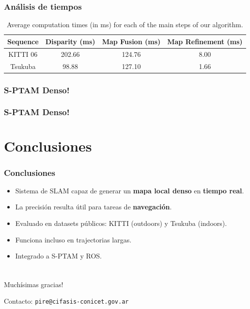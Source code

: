 \documentclass[compress]{beamer}
\begin{document}
\begin{frame}
	\frametitle{Análisis de tiempos}
	\begin{table}[!htb]
		\centering
		\small
		\begin{tabular}{cccc}
			\toprule
			Sequence & Disparity (ms) & Map Fusion (ms) & Map Refinement (ms) \\
			\midrule
			KITTI 06 & 202.66 & 124.76 & 8.00 \\
			Tsukuba & 98.88 & 127.10 & 1.66 \\
			\bottomrule
		\end{tabular}
		\caption{Average computation times (in ms) for each of the main steps of our algorithm.} \label{table:table_times}
	\end{table}
\end{frame}

\begin{frame}
	\frametitle{S-PTAM Denso!}
	\centering
	
\end{frame}

\begin{frame}
	\frametitle{S-PTAM Denso!}
	\centering
	
\end{frame}

\section{Conclusiones}

\begin{frame}
	\frametitle{Conclusiones}
	\begin{itemize}
		\item Sistema de SLAM capaz de generar un \textbf{mapa local denso} en \textbf{tiempo real}.
        \item La precisión resulta útil para tareas de \textbf{navegación}.
        \item Evaluado en datasets públicos: KITTI (outdoors) y Tsukuba (indoors).
        \item Funciona incluso en trajectorias largas.
        \item Integrado a S-PTAM y ROS.
	\end{itemize}
\end{frame}


\section*{}

\begin{frame}
	\centering
	\Large{Muchísimas gracias!}
	
	
	\vspace{2cm}
	Contacto: {\tt pire@cifasis-conicet.gov.ar}
\end{frame}



\end{document}
